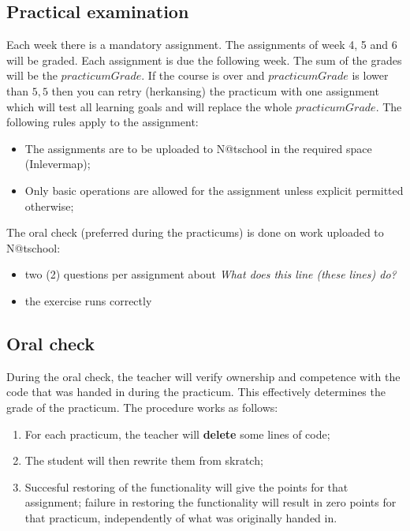 \subsection{Practical examination \modulecode}
Each week there is a mandatory assignment. The assignments of week 4, 5 and 6 will be graded. Each assignment is due the following week. The sum of the grades will be the $practicumGrade$. 
If the course is over and $practicumGrade$ is lower than $5,5$ then you can retry (herkansing) the practicum with one assignment which will test all learning goals and will replace the whole $practicumGrade$.
The following rules apply to the assignment:
\begin{itemize}
  \item The assignments are to be uploaded to N@tschool in the required space (Inlevermap);
  \item Only basic operations are allowed for the assignment unless explicit permitted otherwise; 
\end{itemize}
The oral check  (preferred during the practicums) is done on work uploaded to N@tschool:
\begin{itemize}
  \item two (2) questions per assignment about \textit{What does this line (these lines) do?}
  \item the exercise runs correctly
\end{itemize}


\subsection{Oral check \modulecode}
During the oral check, the teacher will verify ownership and competence with the code that was handed in during the practicum. This effectively determines the grade of the practicum. The procedure works as follows:

\begin{enumerate}
\item For each practicum, the teacher will \textbf{delete} some lines of code;
\item The student will then rewrite them from skratch;
\item Succesful restoring of the functionality will give the points for that assignment; failure in restoring the functionality will result in zero points for that practicum, independently of what was originally handed in.
\end{enumerate}
